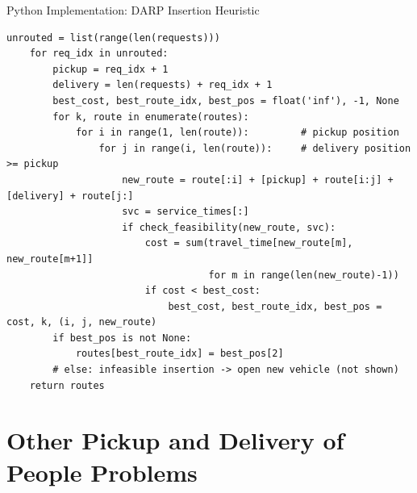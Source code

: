 \documentclass[aspectratio=169,10pt]{beamer}
\begin{document}
\begin{frame}[fragile]{Python Implementation: DARP Insertion Heuristic}
\begin{lstlisting}[caption={DARP insertion heuristic skeleton (Python 3)},
                   label=lst:darp_insertion]
    unrouted = list(range(len(requests)))
    for req_idx in unrouted:
        pickup = req_idx + 1
        delivery = len(requests) + req_idx + 1
        best_cost, best_route_idx, best_pos = float('inf'), -1, None
        for k, route in enumerate(routes):
            for i in range(1, len(route)):         # pickup position
                for j in range(i, len(route)):     # delivery position >= pickup
                    new_route = route[:i] + [pickup] + route[i:j] + [delivery] + route[j:]
                    svc = service_times[:]
                    if check_feasibility(new_route, svc):
                        cost = sum(travel_time[new_route[m], new_route[m+1]]
                                   for m in range(len(new_route)-1))
                        if cost < best_cost:
                            best_cost, best_route_idx, best_pos = cost, k, (i, j, new_route)
        if best_pos is not None:
            routes[best_route_idx] = best_pos[2]
        # else: infeasible insertion -> open new vehicle (not shown)
    return routes
\end{lstlisting}
\end{frame}

\section{Other Pickup and Delivery of People Problems}
\end{document}
